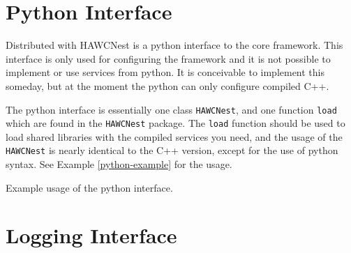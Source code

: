 \documentclass[12pt]{article}
\begin{document}
\section{Python Interface}

Distributed with HAWCNest is a python interface to the core framework. This
interface is only used for configuring the framework and it is not possible to
implement or use services from python. It is conceivable to implement this 
someday, but at the moment the python can only configure compiled C++.

The python interface is essentially one class {\tt HAWCNest}, and one
function {\tt load} which are found in the {\tt HAWCNest} package. The
{\tt load} function should be used to load shared libraries with the compiled
services you need, and the usage of the {\tt HAWCNest} is nearly identical
to the C++ version, except for the use of python syntax. See 
Example \ref{python-example} for the usage.

\begin{example}

\caption{Example usage of the python interface.}
\label{python-example}
\end{example}

\appendix







\section{Logging Interface}
\end{document}
